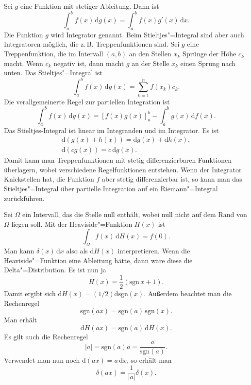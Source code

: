 \documentclass[a4paper,10pt,fleqn,twocolumn,twoside]{article}
\numberwithin{equation}{section}
\begin{document}
Sei $g$ eine Funktion mit stetiger Ableitung. Dann ist
\begin{equation}
\int_a^b f(x)\,\mathrm dg(x) = \int_a^b f(x)g'(x)\,\mathrm dx.
\end{equation}
Die Funktion $g$ wird Integrator genannt. Beim Stieltjes"=Integral
sind aber auch Integratoren möglich, die z.\,B. Treppenfunktionen sind.
Sei $g$ eine Treppenfunktion, die im Intervall $(a,b)$ an den
Stellen $x_k$ Sprünge der Höhe $c_k$ macht. Wenn $c_k$ negativ
ist, dann macht $g$ an der Stelle $x_k$ einen Sprung nach unten.
Das Stieltjes"=Integral ist
\begin{equation}
\int_a^b f(x)\,\mathrm dg(x) = \sum_{k=1}^n f(x_k)c_k.
\end{equation}
Die verallgemeinerte Regel zur partiellen Integration ist
\[\int_a^b f(x)\,\mathrm dg(x) = [f(x)g(x)]_a^b - \int_a^b g(x)\,\mathrm df(x).\]
Das Stieltjes-Integral ist linear im Integranden und im Integrator. Es ist
\begin{gather}
\mathrm d(g(x)+h(x)) = \mathrm dg(x)+\mathrm dh(x),\\
\mathrm d(cg(x)) = c\,\mathrm dg(x).
\end{gather}
Damit kann man Treppenfunktionen mit stetig differenzierbaren
Funktionen überlagern, wobei verschiedene Regelfunktionen entstehen.
Wenn der Integrator Knickstellen hat, die Funktion $f$ aber stetig
differenzierbar ist, so kann man das Stieltjes"=Integral über
partielle Integration auf ein Riemann"=Integral zurückführen.

Sei $\Omega$ ein Intervall, das die Stelle null enthält, wobei
null nicht auf dem Rand von $\Omega$ liegen soll. Mit der
Heaviside"=Funktion $H(x)$ ist
\begin{equation}
\int_{\Omega} f(x)\,\mathrm dH(x) = f(0).
\end{equation}
Man kann $\delta(x)\,\mathrm dx$ also als $\mathrm dH(x)$
interpretieren. Wenn die Heaviside"=Funktion eine Ableitung hätte,
dann wäre diese die Delta"=Distribution. Es ist nun ja
\begin{equation}
H(x) = \frac{1}{2}(\mathrm{sgn}\,x+1).
\end{equation}
Damit ergibt sich $\mathrm dH(x) = (1/2)\mathrm d\mathrm{sgn}(x)$.
Außerdem beachtet man die Rechenregel
\begin{equation}
\mathrm{sgn}(ax) = \mathrm{sgn}(a)\,\mathrm{sgn}(x).
\end{equation}
Man erhält
\begin{equation}
\mathrm dH(ax) = \mathrm{sgn}(a)\,\mathrm dH(x).
\end{equation}
Es gilt auch die Rechenregel
\begin{equation}
|a| = \mathrm{sgn}(a)a = \frac{a}{\mathrm{sgn}(a)}.
\end{equation}
Verwendet man nun noch $\mathrm d(ax) = a\,\mathrm dx$,
so erhält man
\begin{equation}
\delta(ax) = \frac{1}{|a|}\delta(x).
\end{equation}
\end{document}
